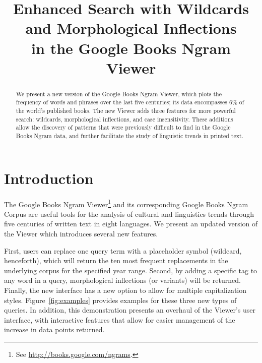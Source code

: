 \documentclass[11pt]{article}
\title{Enhanced Search with Wildcards and Morphological Inflections\\in the Google Books Ngram Viewer}
\date{}
\begin{document}
\maketitle

\begin{abstract}

We present a new version of the Google Books Ngram Viewer, which plots
the frequency of words and phrases over the last five
centuries; its data encompasses 6\% of the world's published books.
The new Viewer adds three features for more powerful search: wildcards,
morphological inflections, and case insensitivity. These additions allow
the discovery of patterns that were previously difficult to find in the Google Books Ngram data,
and further facilitate the study of linguistic trends in printed text.

\end{abstract}

\section{Introduction}

The Google Books Ngram Viewer\footnote{See \url{http://books.google.com/ngrams}.} and its corresponding Google Books Ngram Corpus \cite{lin2012syntactic} are useful tools for the analysis of cultural and linguistics trends through five centuries of written text in eight languages. We present an updated version of the Viewer which introduces several new features. 

First, users can replace one query term with a placeholder symbol (wildcard, henceforth), which will return the ten most frequent replacements in the underlying corpus for the specified year range. Second, by adding a specific tag to any word in a query, morphological inflections (or variants) will be returned. Finally, the new interface has a new option to allow for multiple capitalization styles. Figure~\ref{fig:examples} provides examples for these three new types of queries.
In addition, this demonstration presents an overhaul of the Viewer's user interface, with interactive features that allow for easier management of the increase in data points returned.
\end{document}
